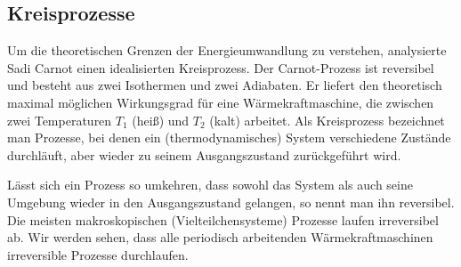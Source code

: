 \subsection{Kreisprozesse}
Um die theoretischen Grenzen der Energieumwandlung zu verstehen, analysierte Sadi Carnot einen idealisierten Kreisprozess. Der Carnot-Prozess ist reversibel und besteht aus zwei Isothermen und zwei Adiabaten. Er liefert den theoretisch maximal möglichen Wirkungsgrad für eine Wärmekraftmaschine, die zwischen zwei Temperaturen $T_1$ (heiß) und $T_2$ (kalt) arbeitet. Als Kreisprozess bezeichnet man Prozesse, bei denen ein (thermodynamisches) System verschiedene Zustände durchläuft, aber wieder zu seinem Ausgangszustand zurückgeführt wird.

Lässt sich ein Prozess so umkehren, dass sowohl das System als auch seine Umgebung wieder in den Ausgangszustand gelangen, so nennt man ihn reversibel. Die meisten makroskopischen (Vielteilchensysteme) Prozesse laufen irreversibel ab. Wir werden sehen, dass alle periodisch arbeitenden Wärmekraftmaschinen irreversible Prozesse durchlaufen.

